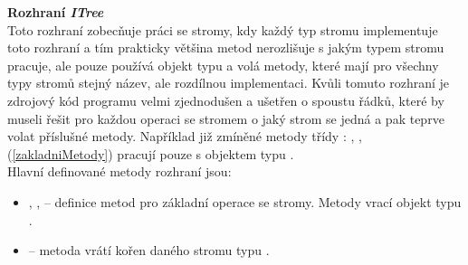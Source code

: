 \documentclass[
  biblatex=false,
  font=serif,
  glossaries=false,
  tables=false,
  theorems=false,
  index
]{kidiplom}
\begin{document}
\smallskip
\noindent \textbf{Rozhraní \textit{ITree}} \label{ITree}\\
\indent Toto rozhraní zobecňuje práci se stromy, kdy každý typ stromu implementuje toto rozhraní a tím prakticky většina metod nerozlišuje s jakým typem stromu pracuje, ale pouze používá objekt typu  a volá metody, které mají pro všechny typy stromů stejný název, ale rozdílnou implementaci. Kvůli tomuto rozhraní je zdrojový kód programu velmi zjednodušen a ušetřen o spoustu řádků, které by museli řešit pro každou operaci se stromem o jaký strom se jedná a pak teprve volat příslušné metody. Například již zmíněné metody třídy : ,  ,  (\ref{zakladniMetody}) pracují pouze s objektem typu .\\
 Hlavní definované metody rozhraní jsou:

\begin{itemize}
\item {},  ,  -- definice metod pro základní operace se stromy. Metody vrací objekt typu .

\item {} -- metoda vrátí kořen daného stromu typu  .
\end{itemize}
\end{document}
